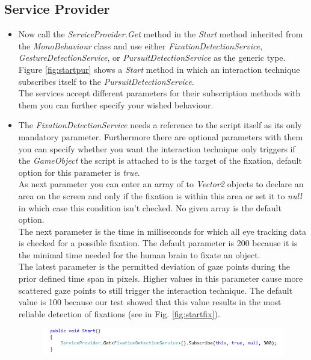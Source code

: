 \documentclass[../../Instructions_Framework]{subfiles}
\begin{document}
\subsection{Service Provider}
\begin{itemize}	
	\item Now call the \textit{ServiceProvider.Get} method in the \textit{Start} method inherited from the \textit{MonoBehaviour} class and use either \textit{FixationDetectionService}, \textit{GestureDetectionService}, or \textit{PursuitDetectionService} as the generic type. Figure \ref{fig:startpur} shows a \textit{Start} method in which an interaction technique subscribes itself to the \textit{PursuitDetectionService}.\\ The services accept different parameters for their subscription methods with them you can further specify your wished behaviour.\\
	\item The \textit{FixationDetectionService} needs a reference to the script itself as its only mandatory parameter. Furthermore there are optional parameters with them you can specify whether you want the interaction technique only triggers if the \textit{GameObject} the script is attached to is the target of the fixation, default option for this parameter is \textit{true}.\\
	As next parameter you can enter an array of to \textit{Vector2} objects to declare an area on the screen and only if the fixation is within this area or set it to \textit{null} in which case this condition isn't checked. No given array is the default option.\\
	The next parameter is the time in milliseconds for which all eye tracking data is checked for a possible fixation. The default parameter is 200 because it is the minimal time needed for the human brain to fixate an object.\\
	The latest parameter is the permitted deviation of gaze points during the prior defined time span in pixels. Higher values in this parameter cause more scattered gaze points to still trigger the interaction technique. The default value is 100 because our test showed that this value results in the most reliable detection of fixations (see in Fig. \ref{fig:startfix}).
	\begin{figure}[h!]
		\centering
		\includegraphics[width=0.7\linewidth]{img/StartFix}

\end{figure}
\end{itemize}
\end{document}
